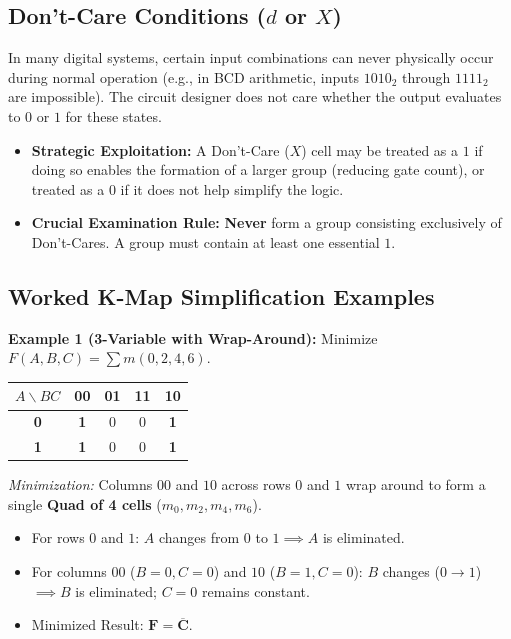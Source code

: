 \subsection{Don't-Care Conditions ($d$ or $X$)}
In many digital systems, certain input combinations can never physically occur during normal operation (e.g., in BCD arithmetic, inputs $1010_2$ through $1111_2$ are impossible). The circuit designer does not care whether the output evaluates to $0$ or $1$ for these states.
\begin{itemize}
    \item \textbf{Strategic Exploitation:} A Don't-Care ($X$) cell may be treated as a $1$ if doing so enables the formation of a larger group (reducing gate count), or treated as a $0$ if it does not help simplify the logic.
    \item \textbf{Crucial Examination Rule:} \textbf{Never} form a group consisting exclusively of Don't-Cares. A group must contain at least one essential $1$.
\end{itemize}

\subsection{Worked K-Map Simplification Examples}
\textbf{Example 1 (3-Variable with Wrap-Around):} Minimize $F(A, B, C) = \sum m(0, 2, 4, 6)$.
\begin{center}
\small
\begin{tabular}{|c|c|c|c|c|}
\hline
$A \backslash BC$ & \textbf{00} & \textbf{01} & \textbf{11} & \textbf{10} \\
\hline
\textbf{0} & \textbf{1} & 0 & 0 & \textbf{1} \\
\hline
\textbf{1} & \textbf{1} & 0 & 0 & \textbf{1} \\
\hline
\end{tabular}
\end{center}
\textit{Minimization:} Columns $00$ and $10$ across rows $0$ and $1$ wrap around to form a single \textbf{Quad of 4 cells} ($m_0, m_2, m_4, m_6$).
\begin{itemize}
    \item For rows $0$ and $1$: $A$ changes from $0$ to $1 \implies A$ is eliminated.
    \item For columns $00$ ($B=0, C=0$) and $10$ ($B=1, C=0$): $B$ changes ($0 \to 1$) $\implies B$ is eliminated; $C=0$ remains constant.
    \item Minimized Result: $\mathbf{F = \overline{C}}$.
\end{itemize}

